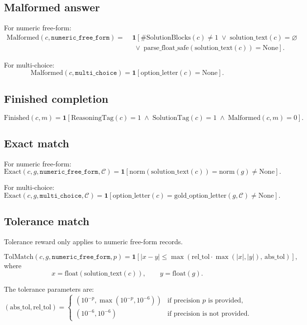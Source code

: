 \documentclass[11pt]{article}
\newcommand{\ind}{\mathbf{1}}
\newcommand{\None}{\mathrm{None}}
\begin{document}
\subsection*{Malformed answer}
For numeric free-form:
\[
\begin{aligned}
\mathrm{Malformed}(c,\texttt{numeric\_free\_form})
=\;&\ind\!\left[
\#\mathrm{SolutionBlocks}(c)\neq 1
\;\vee\;
\mathrm{solution\_text}(c)=\varnothing \right. \\
&\left. \;\vee\;
\mathrm{parse\_float\_safe}(\mathrm{solution\_text}(c))=\None
\right].
\end{aligned}
\]

For multi-choice:
\[
\mathrm{Malformed}(c,\texttt{multi\_choice})
=
\ind\!\left[
\mathrm{option\_letter}(c)=\None
\right].
\]

\subsection*{Finished completion}
\[
\mathrm{Finished}(c,m)
=
\ind\!\left[
\mathrm{ReasoningTag}(c)=1
\;\wedge\;
\mathrm{SolutionTag}(c)=1
\;\wedge\;
\mathrm{Malformed}(c,m)=0
\right].
\]

\subsection*{Exact match}
For numeric free-form:
\[
\mathrm{Exact}(c,g,\texttt{numeric\_free\_form},\mathcal{C})
=
\ind\!\left[
\mathrm{norm}(\mathrm{solution\_text}(c))
=
\mathrm{norm}(g)
\neq
\None
\right].
\]

For multi-choice:
\[
\mathrm{Exact}(c,g,\texttt{multi\_choice},\mathcal{C})
=
\ind\!\left[
\mathrm{option\_letter}(c)
=
\mathrm{gold\_option\_letter}(g,\mathcal{C})
\neq
\None
\right].
\]

\subsection*{Tolerance match}
Tolerance reward only applies to numeric free-form records.

\[
\mathrm{TolMatch}(c,g,\texttt{numeric\_free\_form},p)
=
\ind\!\left[
\left|x-y\right|
\le
\max\!\left(\mathrm{rel\_tol}\cdot\max(|x|,|y|),\,\mathrm{abs\_tol}\right)
\right],
\]
where
\[
x = \mathrm{float}(\mathrm{solution\_text}(c)),
\qquad
y = \mathrm{float}(g).
\]

The tolerance parameters are:
\[
(\mathrm{abs\_tol}, \mathrm{rel\_tol}) =
\begin{cases}
(10^{-p}, \max(10^{-p}, 10^{-6})) & \text{if precision } p \text{ is provided}, \\
(10^{-6}, 10^{-6}) & \text{if precision is not provided.}
\end{cases}
\]
\end{document}
